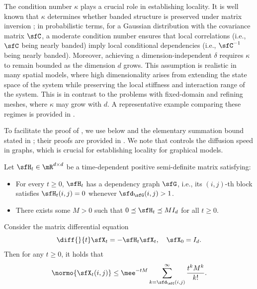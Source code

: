 \documentclass[11pt]{article}
\begin{document}
\begin{rem}
The condition number $\kappa$ plays a crucial role in establishing locality. It is well known that $\kappa$ determines whether banded structure is preserved under matrix inversion \cite{MR758197,MR2848418}; in probabilistic terms, for a Gaussian distribution with the covariance matrix $\sfC$, a moderate condition number ensures that local correlations (i.e., $\sfC$ being nearly banded) imply local conditional dependencies (i.e., $\sfC^{-1}$ being nearly banded).
%
Moreover, achieving a dimension-independent $\delta$ requires $\kappa$ to remain bounded as the dimension $d$ grows.
This assumption is realistic in many spatial models, where high dimensionality arises from extending the state space of the system while preserving the local stiffness and interaction range of the system.
This is in contrast to the problems with fixed-domain and refining meshes, where $\kappa$ may grow with $d$.
A representative example comparing these regimes is provided in .
\end{rem}


To facilitate the proof of , we use  below and the elementary summation bound stated in ; their proofs are provided in .
We note that  controls the diffusion speed in graphs, which is crucial for establishing locality for graphical models.

\begin{lem}
\label{lem:diff_ctrl}
Let $\sfH_t \in \mR^{d\times d}$ be a time-dependent positive semi-definite matrix satisfying:
\begin{itemize}
    \item For every $t\ge 0$, $\sfH_t$ has a dependency graph $\sfG$, i.e., its $(i,j)$-th block satisfies $\sfH_{t}(i,j) = 0$ whenever $\sfd_\sfG(i,j)>1$.
    \item There exists some $M>0$ such that $0 \preceq \sfH_t \preceq MI_d$ for all $t\ge 0$.
\end{itemize}
Consider the matrix differential equation
\begin{equation}
\label{eqn:MatODE}
    \diff{}{t} \sfX_t = - \sfH_t \sfX_t, \quad \sfX_0 = I_d.
\end{equation}
Then for any $t\ge 0$, it holds that 
\begin{equation}
    \normo{ \sfX_{t}(i,j) } \le \mee^{-tM} \sum_{k=\sfd_\sfG(i,j)}^\infty \frac{t^k M^k}{k!}.
\end{equation}
\end{lem}
\end{document}
